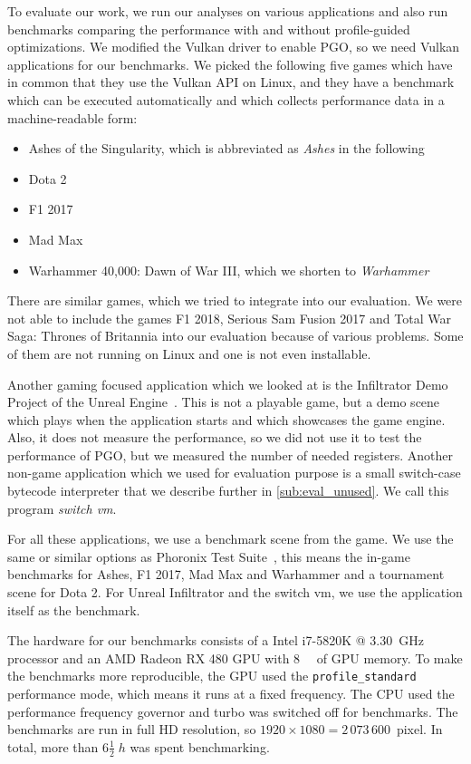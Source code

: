 \clearpage
{}
To evaluate our work, we run our analyses on various applications and also run benchmarks comparing the performance with and without profile-guided optimizations.
We modified the Vulkan driver to enable PGO, so we need Vulkan applications for our benchmarks.
We picked the following five games which have in common that they use the Vulkan API on Linux, and they have a benchmark which can be executed automatically and which collects performance data in a machine-readable form:
\begin{itemize}
	\item Ashes of the Singularity, which is abbreviated as \emph{Ashes} in the following
	\item Dota 2
	\item F1 2017
	\item Mad Max
	\item Warhammer 40,000: Dawn of War III, which we shorten to \emph{Warhammer}
\end{itemize}
There are similar games, which we tried to integrate into our evaluation.
We were not able to include the games F1 2018, Serious Sam Fusion 2017 and Total War Saga: Thrones of Britannia into our evaluation because of various problems.
Some of them are not running on Linux and one is not even installable.

Another gaming focused application which we looked at is the Infiltrator Demo Project of the Unreal Engine~\cite{Games2015}.
This is not a playable game, but a demo scene which plays when the application starts and which showcases the game engine.
Also, it does not measure the performance, so we did not use it to test the performance of PGO, but we measured the number of needed registers.
Another non-game application which we used for evaluation purpose is a small switch-case bytecode interpreter that we describe further in \cref{sub:eval_unused}. We call this program \emph{switch vm}.

For all these applications, we use a benchmark scene from the game.
We use the same or similar options as Phoronix Test Suite~\cite{Phoronix}, this means the in-game benchmarks for Ashes, F1 2017, Mad Max and Warhammer and a tournament scene for Dota 2.
For Unreal Infiltrator and the switch vm, we use the application itself as the benchmark.

The hardware for our benchmarks consists of a Intel i7-5820K @ \SI{3.30}{\giga\hertz} processor and an AMD Radeon RX 480 GPU with \SI{8}{\giga\byte} of GPU memory.
To make the benchmarks more reproducible, the GPU used the \texttt{profile\_standard} performance mode, which means it runs at a fixed frequency.
The CPU used the performance frequency governor and turbo was switched off for benchmarks.
The benchmarks are run in full HD resolution, so $1920 \times 1080 = 2\,073\,600$~pixel.
In total, more than $6 \frac{1}{2}\;\si{h}$ was spent benchmarking.

